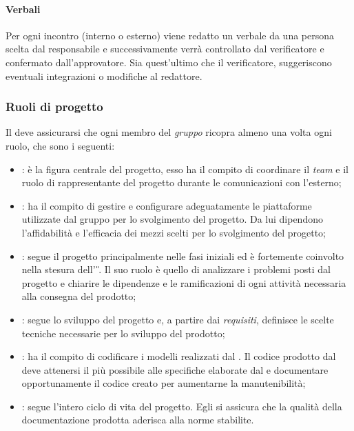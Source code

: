 	\paragraph{Verbali}
	Per ogni incontro (interno o esterno) viene redatto un verbale da una persona scelta dal responsabile e successivamente verrà controllato dal verificatore e confermato dall’approvatore. Sia quest'ultimo che il verificatore, suggeriscono eventuali integrazioni o modifiche al redattore.

\subsubsection{Ruoli di progetto} 
Il \RdP{} deve assicurarsi che ogni membro del \emph{gruppo} ricopra almeno una volta ogni ruolo, che sono i seguenti:
	\begin{itemize}
		\item \textbf{\RdP}: è la figura centrale del progetto, esso ha il compito di coordinare il \emph{team} e il ruolo di rappresentante del progetto durante le comunicazioni con l'esterno;
		\item \textbf{\Amm}: ha il compito di gestire e configurare adeguatamente le piattaforme utilizzate dal gruppo per lo svolgimento del progetto. Da lui dipendono l'affidabilità e l'efficacia dei mezzi scelti per lo svolgimento del progetto;
		\item \textbf{\Ana}: segue il progetto principalmente nelle fasi iniziali ed è fortemente coinvolto nella stesura dell' \AdR{}\textit{\G}. Il suo ruolo è quello di analizzare i problemi posti dal progetto e chiarire le dipendenze e le ramificazioni di ogni attività necessaria alla consegna del prodotto;
		\item \textbf{\Prog}: segue lo sviluppo del progetto e, a partire dai \emph{requisiti}, definisce le scelte tecniche necessarie per lo sviluppo del prodotto;
		\item \textbf{\Progm}: ha il compito di codificare i modelli realizzati dal \Prog{}. Il codice prodotto dal \Progm{} deve attenersi il più possibile alle specifiche elaborate dal \Prog{} e documentare opportunamente il codice creato per aumentarne la manutenibilità;
		\item \textbf{\Ver}: segue l'intero ciclo di vita del progetto. Egli si assicura che la qualità della documentazione prodotta aderisca alla norme stabilite.
	\end{itemize}

